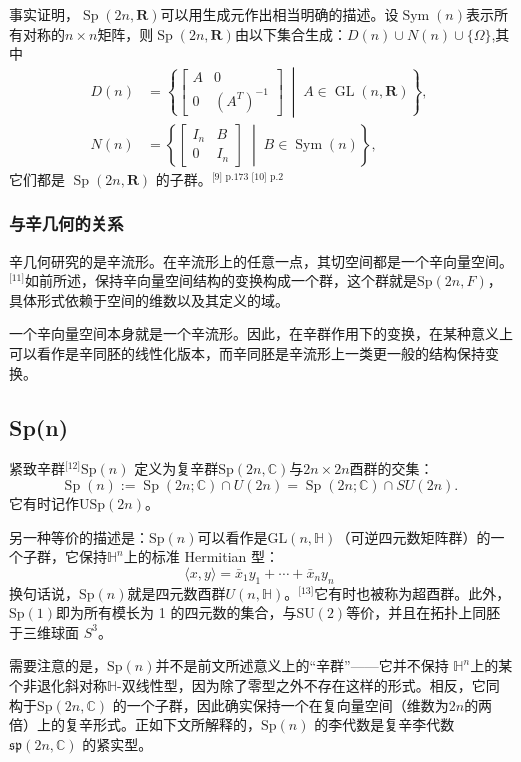 事实证明，$\operatorname{Sp}(2n, \mathbf{R})$可以用生成元作出相当明确的描述。设$\operatorname{Sym}(n)$表示所有对称的$n \times n$矩阵，则$\operatorname{Sp}(2n, \mathbf{R})$由以下集合生成：$D(n) \cup N(n) \cup \{\Omega\}$,其中
$$
\begin{aligned}
D(n) &= \left\{ 
\begin{bmatrix}
A & 0 \\
0 & (A^{T})^{-1}
\end{bmatrix}
\;\middle|\; A \in \operatorname{GL}(n, \mathbf{R})
\right\},\\
N(n) &= \left\{
\begin{bmatrix}
I_{n} & B \\
0 & I_{n}
\end{bmatrix}
\;\middle|\; B \in \operatorname{Sym}(n)
\right\},
\end{aligned}~
$$
它们都是 $\operatorname{Sp}(2n, \mathbf{R})$ 的子群。\(^\text{[9] p.173 [10] p.2}\)
\subsubsection{与辛几何的关系}
辛几何研究的是辛流形。在辛流形上的任意一点，其切空间都是一个辛向量空间。\(^\text{[11]}\)如前所述，保持辛向量空间结构的变换构成一个群，这个群就是$\mathrm{Sp}(2n, F)$，具体形式依赖于空间的维数以及其定义的域。

一个辛向量空间本身就是一个辛流形。因此，在辛群作用下的变换，在某种意义上可以看作是辛同胚的线性化版本，而辛同胚是辛流形上一类更一般的结构保持变换。
\subsection{Sp(n)}
紧致辛群\(^\text{[12]}\)$\mathrm{Sp}(n)$ 定义为复辛群$\mathrm{Sp}(2n, \mathbb{C})$与$2n \times 2n$酉群的交集：
$$
\operatorname{Sp}(n) := \operatorname{Sp}(2n;\mathbb{C}) \cap U(2n) 
= \operatorname{Sp}(2n;\mathbb{C}) \cap SU(2n).~
$$
它有时记作$\mathrm{USp}(2n)$。

另一种等价的描述是：$\mathrm{Sp}(n)$可以看作是$\mathrm{GL}(n, \mathbb{H})$（可逆四元数矩阵群）的一个子群，它保持$\mathbb{H}^n$上的标准 Hermitian 型：
$$
\langle x, y \rangle = \bar{x}_1 y_1 + \cdots + \bar{x}_n y_n~
$$
换句话说，$\mathrm{Sp}(n)$就是四元数酉群$U(n, \mathbb{H})$。\(^\text{[13]}\)它有时也被称为超酉群。此外，$\mathrm{Sp}(1)$即为所有模长为 1 的四元数的集合，与$\mathrm{SU}(2)$等价，并且在拓扑上同胚于三维球面 $S^3$。

需要注意的是，$\mathrm{Sp}(n)$并不是前文所述意义上的“辛群”——它并不保持 $\mathbb{H}^n$上的某个非退化斜对称$\mathbb{H}$-双线性型，因为除了零型之外不存在这样的形式。相反，它同构于$\mathrm{Sp}(2n, \mathbb{C})$ 的一个子群，因此确实保持一个在复向量空间（维数为$2n$的两倍）上的复辛形式。正如下文所解释的，$\mathrm{Sp}(n)$ 的李代数是复辛李代数 $\mathfrak{sp}(2n, \mathbb{C})$ 的紧实型。

